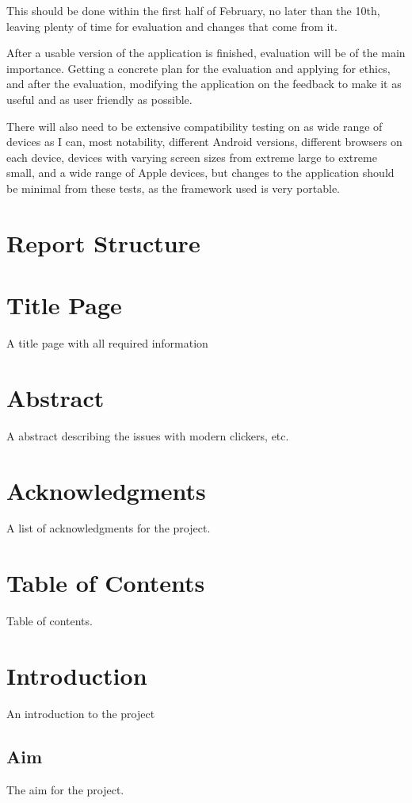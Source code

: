\documentclass{article}
\begin{document}
This should be done within the first half of February, no later than the 10th, leaving plenty of time for evaluation and changes that come from it.

After a usable version of the application is finished, evaluation will be of the main importance. Getting a concrete plan for the evaluation and applying for ethics, and after the evaluation, modifying the application on the feedback to make it as useful and as user friendly as possible. 

There will also need to be extensive compatibility testing on as wide range of devices as I can, most notability, different Android versions, different browsers on each device, devices with varying screen sizes from extreme large to extreme small, and a wide range of Apple devices, but changes to the application should be minimal from these tests, as the framework used is very portable.

\newpage
\section{Report Structure}
\section{Title Page}
A title page with all required information

\section{Abstract}
A abstract describing the issues with modern clickers, etc.

\section{Acknowledgments}
A list of acknowledgments for the project.

\section{Table of Contents}
Table of contents.

\section{Introduction}
An introduction to the project
\subsection{Aim}
The aim for the project.
\end{document}
